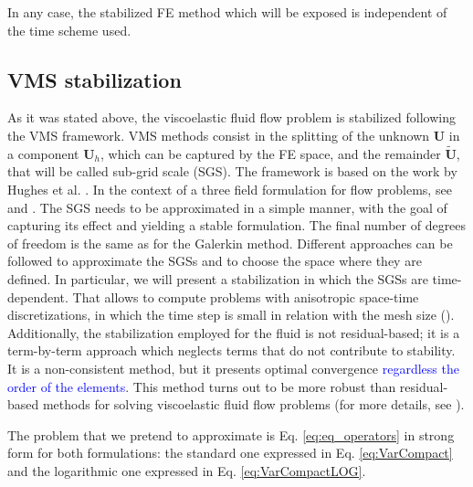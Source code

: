 \documentclass[11pt,english]{article}
\begin{document}
In any case, the stabilized FE method which will be exposed is independent of the time scheme used.


\subsection{VMS stabilization}

As it was stated above, the viscoelastic fluid flow problem is stabilized following the VMS framework. VMS methods consist in the splitting of the unknown $\boldsymbol{U}$ in a component $\boldsymbol{U}_{h}$, which can be captured by the FE space, and the remainder $\tilde{\boldsymbol{U}}$, that will be called sub-grid scale (SGS). The framework is based on the work by Hughes et al. \cite{hughes1998variational}. In the context of a three field formulation for flow problems, see \cite{codina2009} and \cite{castillo2014}. The SGS needs to be approximated in a simple manner, with the goal of capturing its effect and yielding a stable formulation.
The final number of degrees of freedom is the same as for the Galerkin method. Different approaches can be followed to approximate the SGSs and to choose the space where they are defined. In particular, we will  present a stabilization in which the SGSs are time-dependent. That allows to compute problems with anisotropic space-time discretizations, in which the time step is small in relation with the mesh size (\cite{badia2007multiscale,codina2007time,moreno2020solution}).  Additionally, the stabilization employed for the fluid is not residual-based; it is a term-by-term approach which neglects terms that do not contribute to stability. It is a non-consistent method, but it presents optimal convergence \textcolor{blue}{regardless the order of the elements}. This method turns out to be more robust than residual-based methods for solving viscoelastic fluid flow problems (for more details, see \cite{castillo2014,moreno2019logarithmic}).

The problem that we pretend to approximate is Eq. \eqref{eq:eq_operators} in strong form for both formulations: the standard one expressed in Eq. \eqref{eq:VarCompact} and the logarithmic one expressed in Eq. \eqref{eq:VarCompactLOG}.
\end{document}
